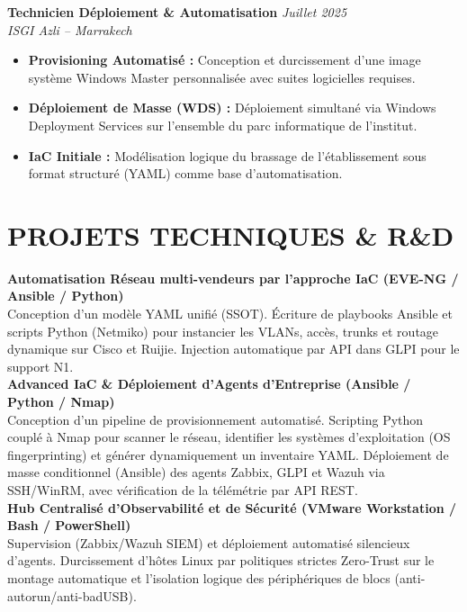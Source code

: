 \documentclass[10pt,a4paper]{article}
\begin{document}
\vspace{-0.15cm}
\noindent
\textbf{Technicien Déploiement \& Automatisation} \hfill \textit{Juillet 2025}\\
\textit{ISGI Azli -- Marrakech}
\begin{itemize}[leftmargin=*, itemsep=0.8pt, parsep=0pt, topsep=1.0pt]
    \item \textbf{Provisioning Automatisé :} Conception et durcissement d'une image système Windows Master personnalisée avec suites logicielles requises.
    \item \textbf{Déploiement de Masse (WDS) :} Déploiement simultané via Windows Deployment Services sur l'ensemble du parc informatique de l'institut.
    \item \textbf{IaC Initiale :} Modélisation logique du brassage de l'établissement sous format structuré (YAML) comme base d'automatisation.
\end{itemize}

\section*{PROJETS TECHNIQUES \& R\&D}
\noindent
\textbf{Automatisation Réseau multi-vendeurs par l'approche IaC (EVE-NG / Ansible / Python)}\\
Conception d'un modèle YAML unifié (SSOT). Écriture de playbooks Ansible et scripts Python (Netmiko) pour instancier les VLANs, accès, trunks et routage dynamique sur Cisco et Ruijie. Injection automatique par API dans GLPI pour le support N1.\\[2.5pt]
\textbf{Advanced IaC \& Déploiement d'Agents d'Entreprise (Ansible / Python / Nmap)}\\
Conception d'un pipeline de provisionnement automatisé. Scripting Python couplé à Nmap pour scanner le réseau, identifier les systèmes d'exploitation (OS fingerprinting) et générer dynamiquement un inventaire YAML. Déploiement de masse conditionnel (Ansible) des agents Zabbix, GLPI et Wazuh via SSH/WinRM, avec vérification de la télémétrie par API REST.\\[2.5pt]
\textbf{Hub Centralisé d'Observabilité et de Sécurité (VMware Workstation / Bash / PowerShell)}\\
Supervision (Zabbix/Wazuh SIEM) et déploiement automatisé silencieux d'agents. Durcissement d'hôtes Linux par politiques strictes Zero-Trust sur le montage automatique et l'isolation logique des périphériques de blocs (anti-autorun/anti-badUSB).
\end{document}
